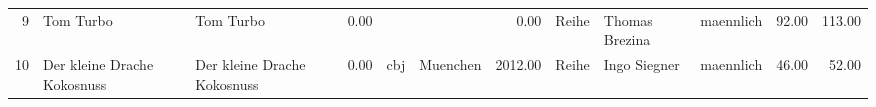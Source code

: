 \begin{table}
\begin{center}
{\begin{tabular}{rllrllrlllrr}
  9 & Tom Turbo                                                                                                                                                                                                                                                       & Tom Turbo                                                                                                                                                                                                                                                       & 0.00 &                                                                                                                                                                                                                                                                 &                                                                                                                                                                                                                                                                 & 0.00 & Reihe & Thomas Brezina                                                                                                                                                                                                                                                  & maennlich & 92.00 & 113.00 \\ 
  10 & Der kleine Drache Kokosnuss                                                                                                                                                                                                                                     & Der kleine Drache Kokosnuss                                                                                                                                                                                                                                     & 0.00 & cbj                                                                                                                                                                                                                                                             & Muenchen                                                                                                                                                                                                                                                        & 2012.00 & Reihe & Ingo Siegner                                                                                                                                                                                                                                                    & maennlich & 46.00 & 52.00 \\ 

\end{tabular}}
\end{center}
\end{table}

